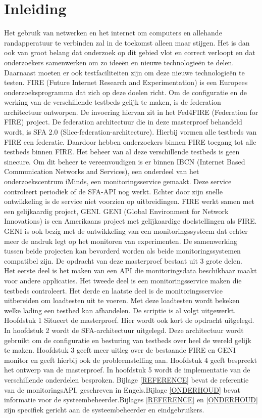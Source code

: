 \chapter{Inleiding}
\npar
Het gebruik van netwerken en het internet om computers en allehande randapperatuur te verbinden zal in de toekomst alleen maar stijgen. Het is dan ook van groot belang dat onderzoek op dit gebied vlot en correct verloopt en dat onderzoekers samenwerken om zo idee\"en en nieuwe technologie\"en te delen. Daarnaast moeten er ook testfaciliteiten zijn om deze nieuwe technologie\"en te testen.
FIRE (Future Internet Research and Experimentation) is een Europees onderzoeksprogramma dat zich op deze doelen richt.
\npar
Om de configuratie en de werking van de verschillende testbeds gelijk te maken, is de federation architectuur ontworpen. De invoering hiervan zit in het Fed4FIRE (Federation for FIRE) project. De federation architectuur die in deze masterproef behandeld wordt, is SFA 2.0 (Slice-federation-architecture). Hierbij vormen alle testbeds van FIRE een federatie. Daardoor hebben onderzoekers binnen FIRE toegang tot alle testbeds binnen FIRE.
\npar
Het beheer van al deze verschillende testbeds is geen sinecure. Om dit beheer te vereenvoudigen is er binnen IBCN (Internet Based Communication Networks and Services), een onderdeel van het onderzoekscentrum iMinds, een monitoringsservice gemaakt. Deze service controleert periodiek of de SFA-API nog werkt. Echter door zijn snelle ontwikkeling is de service niet voorzien op uitbreidingen.
\npar
FIRE werkt samen met een gelijkaardig project, GENI. GENI (Global Environment for Network Innovations) is een Amerikaans project met gelijkaardige doelstellingen als FIRE. GENI is ook bezig met de ontwikkeling van een monitoringssysteem dat echter meer de nadruk legt op het monitoren van experimenten. De samenwerking tussen beide projecten kan bevorderd worden als beide monitoringssystemen compatibel zijn.
\npar
De opdracht van deze masterproef bestaat uit 3 grote delen. \\
Het eerste deel is het maken van een API die monitoringsdata beschikbaar maakt voor andere applicaties. Het tweede deel is een monitoringsservice maken die testbeds controleert. Het derde en laatste deel is de monitoringsservice uitbereiden om loadtesten uit te voeren. Met deze loadtesten wordt bekeken welke lading een testbed kan afhandelen.
\clearpage
\npar
De scriptie is al volgt uitgewerkt.
Hoofdstuk 1 Situeert de masterproef. Hier wordt ook kort de opdracht uitgelegd. In hoofdstuk 2 wordt de SFA-architectuur uitgelegd. Deze architectuur wordt gebruikt om de configuratie en besturing van testbeds over heel de wereld gelijk te maken.
\npar
Hoofdstuk 3 geeft meer uitleg over de bestaande FIRE en GENI monitor en geeft hierbij ook de probleemstelling aan. Hoofdstuk 4 geeft bespreekt het ontwerp van de masterproef. In hoofdstuk 5 wordt de implementatie van de verschillende onderdelen besproken.
\npar
Bijlage \ref{REFERENCE} bevat de referentie van de monitoringsAPI, geschreven in Engels.Bijlage \ref{ONDERHOUD}  bevat informatie voor de systeembeheerder.Bijlages \ref{REFERENCE} en \ref{ONDERHOUD} zijn specifiek gericht aan de systeembeheerder en eindgebruikers.
